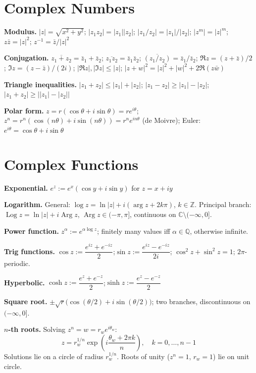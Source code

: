 \documentclass[9pt,twocolumn]{extarticle}
\begin{document}
\pagestyle{empty}
\raggedright


\section{Complex Numbers}

\textbf{Modulus.}
$|z|=\sqrt{x^2+y^2}$;\; $|z_1z_2|=|z_1||z_2|$;\; $|z_1/z_2|=|z_1|/|z_2|$;\; $|z^m|=|z|^m$;\;
$z\bar{z}=|z|^2$;\; $z^{-1}=\bar{z}/|z|^2$

\textbf{Conjugation.}
$\overline{z_1+z_2}=\bar{z}_1+\bar{z}_2$;\; $\overline{z_1z_2}=\bar{z}_1\bar{z}_2$;\;
$\overline{(z_1/z_2)}=\bar{z}_1/\bar{z}_2$;\; $\Re z=(z+\bar{z})/2$;\; $\Im z=(z-\bar{z})/(2i)$;\;
$|\Re z|,|\Im z|\le|z|$;\; $|z+w|^2=|z|^2+|w|^2+2\Re(z\bar{w})$

\textbf{Triangle inequalities.}
$|z_1+z_2|\le|z_1|+|z_2|$;\quad
$|z_1-z_2|\ge|z_1|-|z_2|$;\quad
$|z_1+z_2|\ge\bigl||z_1|-|z_2|\bigr|$

\textbf{Polar form.} $z=r(\cos\theta+i\sin\theta)=re^{i\theta}$;\;
$z^n=r^n(\cos(n\theta)+i\sin(n\theta))=r^ne^{in\theta}$ (de Moivre);\;
Euler: $e^{i\theta}=\cos\theta+i\sin\theta$

\section{Complex Functions}

\textbf{Exponential.} $e^z:=e^x(\cos y+i\sin y)$ for $z=x+iy$

\textbf{Logarithm.} General: $\log z=\ln|z|+i(\arg z+2k\pi)$, $k\in\mathbb{Z}$. Principal branch:
$\operatorname{Log}z=\ln|z|+i\operatorname{Arg}z$, $\operatorname{Arg}z\in(-\pi,\pi]$,
continuous on $\mathbb{C}\setminus(-\infty,0]$.

\textbf{Power function.} $z^\alpha:=e^{\alpha\log z}$;\; finitely many values iff $\alpha\in\mathbb{Q}$, otherwise infinite.

\textbf{Trig functions.} $\cos z:=\dfrac{e^{iz}+e^{-iz}}{2}$;\quad $\sin z:=\dfrac{e^{iz}-e^{-iz}}{2i}$;\quad
$\cos^2z+\sin^2z=1$;\; $2\pi$-periodic.

\textbf{Hyperbolic.} $\cosh z:=\dfrac{e^z+e^{-z}}{2}$;\quad $\sinh z:=\dfrac{e^z-e^{-z}}{2}$

\textbf{Square root.} $\pm\sqrt{r}\bigl(\cos(\theta/2)+i\sin(\theta/2)\bigr)$;\; two branches, discontinuous on $(-\infty,0]$.

\textbf{$n$-th roots.} Solving $z^n=w=r_we^{i\theta_w}$:
$$z=r_w^{1/n}\exp\!\left(i\frac{\theta_w+2\pi k}{n}\right),\quad k=0,\dots,n-1$$
Solutions lie on a circle of radius $r_w^{1/n}$. Roots of unity ($z^n=1$, $r_w=1$) lie on unit circle.
\end{document}

